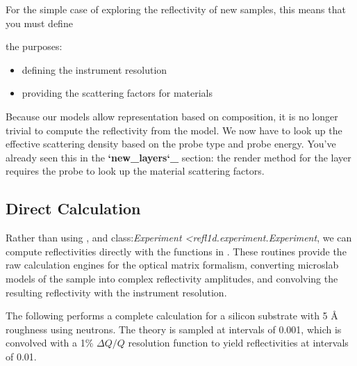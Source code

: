 \documentclass[letterpaper,10pt,english]{sphinxmanual}
\begin{document}
For the simple case of exploring the reflectivity of new samples,
this means that you must define

the
purposes:
\begin{itemize}
\item {} 
defining the instrument resolution

\item {} 
providing the scattering factors for materials

\end{itemize}

Because our models allow representation based on composition, it is no
longer trivial to compute the reflectivity from the model.  We now have
to look up the effective scattering density based on the probe type and
probe energy.  You've already seen this in the {\color{red}\bfseries{}{}`new\_layers{}`\_} section:
the render method for the layer requires the probe to look up the material
scattering factors.


\subsection{Direct Calculation}
\label{guide/experiment:direct-calculation}
Rather than using ,
{\hyperref[api/probe:refl1d.probe.Probe]{}} and
class:\emph{Experiment \textless{}refl1d.experiment.Experiment},
we  can compute reflectivities directly with the functions in
{\hyperref[api/reflectivity:module-refl1d.reflectivity]{}}.  These routines provide the raw
calculation engines for the optical matrix formalism, converting
microslab models of the sample into complex reflectivity amplitudes,
and convolving the resulting reflectivity with the instrument resolution.

The following performs a complete calculation for a silicon
substrate with 5 Å roughness using neutrons.  The theory is sampled
at intervals of 0.001, which is convolved with a 1\% $\Delta Q/Q$ resolution
function to yield reflectivities at intervals of 0.01.
\end{document}
